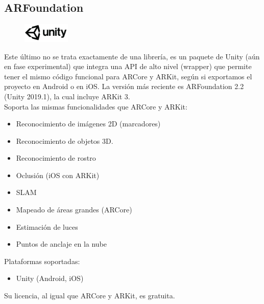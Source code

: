 \clearpage
\subsection{ARFoundation}
\begin{figure}[H]
    \centering
    \includegraphics[width=0.2\textwidth]{Images/Unity_Logo.jpeg}
    \label{fig:my_label}
\end{figure}

Este último no se trata exactamente de una librería, es un paquete de Unity (aún en fase experimental) que integra una API de alto nivel (wrapper) que permite tener el mismo código funcional para ARCore y ARKit, según si exportamos el proyecto en Android o en iOS. La versión más reciente es ARFoundation 2.2 (Unity 2019.1), la cual incluye ARKit 3.\cite{ARFoundation}\\
Soporta las mismas funcionalidades que ARCore y ARKit:
\begin{itemize}
\item Reconocimiento de imágenes 2D (marcadores)
\item Reconocimiento de objetos 3D.
\item Reconocimiento de rostro 
\item Oclusión (iOS con ARKit)
\item SLAM
\item Mapeado de áreas grandes (ARCore)
\item Estimación de luces
\item Puntos de anclaje en la nube
\end{itemize}

Plataformas soportadas:
\begin{itemize}
\item Unity (Android, iOS)
\end{itemize}

Su licencia, al igual que ARCore y ARKit, es gratuita.

\noindent
